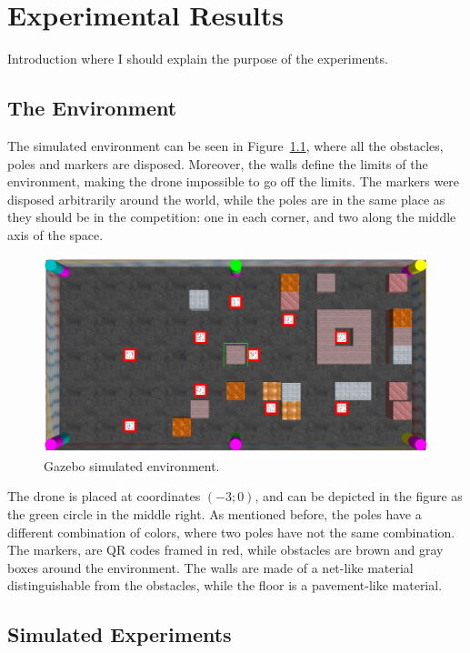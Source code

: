 \chapter{Experimental Results}
\label{chapter3}
Introduction where I should explain the purpose of the experiments.
\section{The Environment}
\label{sec:chapter3:environment}
The simulated environment can be seen in Figure~\ref{fig:chapter3:env:gazebo}, where all the obstacles, poles and markers are disposed. Moreover, the walls define the limits of the environment, making the drone impossible to go off the limits. The markers were disposed arbitrarily around the world, while the poles are in the same place as they should be in the competition: one in each corner, and two along the middle axis of the space.
\begin{figure}
\centering
\includegraphics[width=\textwidth]{Images/fig18-gazebo-environment.png}
\caption{Gazebo simulated environment.}
\label{fig:chapter3:env:gazebo}
\end{figure}
The drone is placed at coordinates $(-3;0)$, and can be depicted in the figure as the green circle in the middle right. As mentioned before, the poles have a different combination of colors, where two poles have not the same combination. The markers, are QR codes framed in red, while obstacles are brown and gray boxes around the environment. The walls are made of a net-like material distinguishable from the obstacles, while the floor is a pavement-like material.

\section{Simulated Experiments}
\label{sec:chapter3:simulation}

